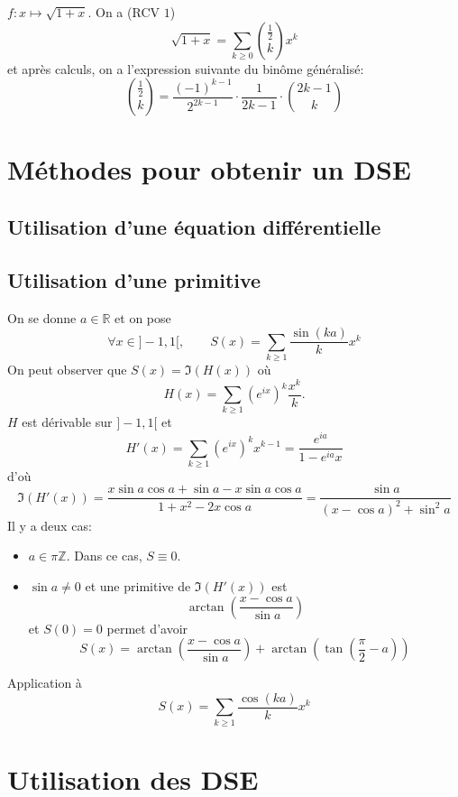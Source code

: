 \begin{ex}
    $f:x\longmapsto \sqrt{1+x}$. On a (RCV $1$) \[
        \sqrt{1+x}=\sum_{k\geq 0}\binom {\frac12}kx^k
    \]
    et après calculs, on a l'expression suivante du binôme généralisé: \[
        \binom{\frac12}k=\frac{(-1)^{k-1}}{2^{2k-1}}\cdot \frac1{2k-1}\cdot \binom{2k-1}k
    \]
\end{ex}

\section{Méthodes pour obtenir un DSE}
\subsection{Utilisation d'une équation différentielle}

\subsection{Utilisation d'une primitive}
On se donne $a\in\mathbb R$ et on pose \[
    \forall x\in ]-1, 1[, \qquad S(x)=\sum_{k\geq 1}\frac{\sin(ka)}kx^k
\]
On peut observer que $S(x)=\Im(H(x))$ où \[
    H(x)=\sum_{k\geq 1}(e^{ix})^k\frac{x^k}k.
\]
$H$ est dérivable sur $]-1, 1[$ et \[
    H'(x)=\sum_{k\geq 1}(e^{ix})^kx^{k-1}=\frac{e^{ia}}{1-e^{ia}x}
\]
d'où \[
    \Im(H'(x))=\frac{x\sin a\cos a+\sin a-x\sin a\cos a}{1+x^2-2x\cos a}=\frac{\sin a}{(x-\cos a)^2+\sin^2a}
\]
Il y a deux cas: \begin{itemize}
    \item $a\in\pi\mathbb Z$. Dans ce cas, $S\equiv 0$.
    \item $\sin a\neq 0$ et une primitive de $\Im(H'(x))$ est \[
            \arctan \left( \frac{x-\cos a}{\sin a} \right)
        \]
        et $S(0)=0$ permet d'avoir \[
            S(x)=\arctan \left( \frac{x-\cos a}{\sin a} \right)+\arctan \left( \tan \left( \frac\pi2-a \right) \right)
        \]
\end{itemize}

\begin{exo}
    Application à \[
        S(x)=\sum_{k\geq 1}\frac{\cos (ka)}kx^k
    \]
\end{exo}

\section{Utilisation des DSE}

